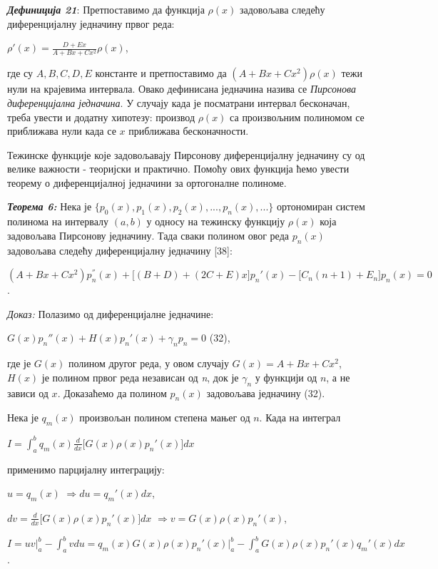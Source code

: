 \emph{\textbf{Дефиниција 21}}: Претпоставимо да функција \(\rho(x)\)
задовољава следећу диференцијалну једначину првог реда:

\(\rho'(x) = \frac{D + Ex}{A + Bx + Cx^{2}}\rho(x)\),

где су \(A,B,C,D,E\) константе и претпоставимо да
\((A + Bx + Cx^{2})\rho(x)\) тежи нули на крајевима интервала. Овако
дефинисана једначина назива се \emph{Пирсонова диференцијална
једначина}. У случају када је посматрани интервал бесконачан, треба
увести и додатну хипотезу: производ \(\rho(x)\) са произвољним полиномом
се приближава нули када се \(x\) приближава бесконачности.

Тежинске функције које задовољавају Пирсонову диференцијалну једначину
су од велике важности - теоријски и практично. Помоћу ових функција ћемо
увести теорему о диференцијалној једначини за ортогоналне полиноме.

\emph{\textbf{Теорема 6:}} Нека је
\(\{ p_{0}(x),p_{1}(x),p_{2}(x),...,p_{n}(x),...\}\) ортономиран систем
полинома на интервалу \((a,b)\) у односу на тежинску функцију
\(\rho(x)\) која задовољава Пирсонову једначину. Тада сваки полином овог
реда \(p_{n}(x)\) задовољава следећу диференцијалну једначину {[}38{]}:

\((A + Bx + Cx^{2})p_{n}^{''}(x) + \lbrack(B + D) + (2C + E)x\rbrack p_{n}'(x) - \lbrack C_{n}(n + 1) + E_{n}\rbrack p_{n}(x) = 0\).

\emph{Доказ:} Полазимо од диференцијалне једначине:

\(G(x)p_{n}''(x) + H(x)p_{n}'(x) + \gamma_{n}p_{n} = 0\) (32),

где је \(G(x)\) полином другог реда, у овом случају
\(G(x) = A + Bx + Cx^{2}\), \(H(x)\) је полином првог реда независан од
\emph{n}, док је \(\gamma_{n}\) у функцији од \(n\), а не зависи од
\(x\). Доказаћемо да полином \(p_{n}(x)\) задовољава једначину (32).

Нека је \(q_{m}(x)\) произвољан полином степена мањег од \(n\). Када на
интеграл

\(I = \int_{a}^{b}q_{m}(x)\frac{d}{dx}\lbrack G(x)\rho(x)p_{n}'(x)\rbrack dx\)

применимо парцијалну интеграцију:

\(u = q_{m}(x)\) \(\Rightarrow du = q_{m}'(x)dx\),

\(dv = \frac{d}{dx}\lbrack G(x)\rho(x)p_{n}'(x)\rbrack dx\)
\(\Rightarrow v = G(x)\rho(x)p_{n}'(x)\),

\(I = uv|_{a}^{b} - \int_{a}^{b}vdu = \boxed{q_{m}(x)G(x)\rho(x)p_{n}'(x)|_{a}^{b}} - \int_{a}^{b}G(x)\rho(x)p_{n}'(x)q_{m}'(x)dx\).

